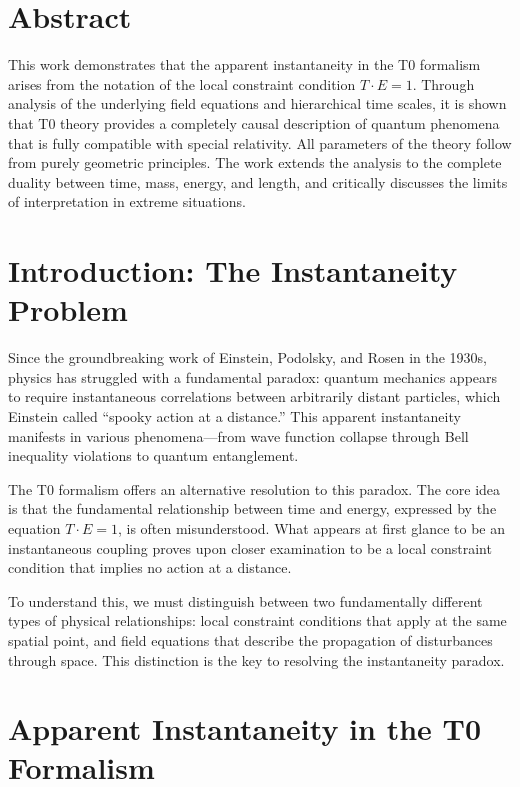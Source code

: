 \section*{Abstract}
		This work demonstrates that the apparent instantaneity in the T0 formalism arises from the notation of the local constraint condition $T \cdot E = 1$. Through analysis of the underlying field equations and hierarchical time scales, it is shown that T0 theory provides a completely causal description of quantum phenomena that is fully compatible with special relativity. All parameters of the theory follow from purely geometric principles. The work extends the analysis to the complete duality between time, mass, energy, and length, and critically discusses the limits of interpretation in extreme situations.


	\hypersetup{linkcolor=blue}

	\section{Introduction: The Instantaneity Problem}
	
	Since the groundbreaking work of Einstein, Podolsky, and Rosen in the 1930s, physics has struggled with a fundamental paradox: quantum mechanics appears to require instantaneous correlations between arbitrarily distant particles, which Einstein called ``spooky action at a distance.'' This apparent instantaneity manifests in various phenomena—from wave function collapse through Bell inequality violations to quantum entanglement.
	
	The T0 formalism offers an alternative resolution to this paradox. The core idea is that the fundamental relationship between time and energy, expressed by the equation $T \cdot E = 1$, is often misunderstood. What appears at first glance to be an instantaneous coupling proves upon closer examination to be a local constraint condition that implies no action at a distance.
	
	To understand this, we must distinguish between two fundamentally different types of physical relationships: local constraint conditions that apply at the same spatial point, and field equations that describe the propagation of disturbances through space. This distinction is the key to resolving the instantaneity paradox.
	
	\section{Apparent Instantaneity in the T0 Formalism}
	
